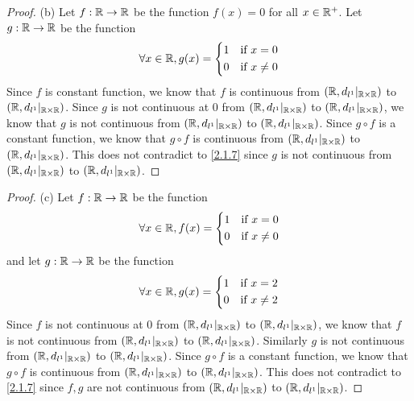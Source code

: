 \begin{proof}{(b)}
  Let \(f : \mathbb{R} \to \mathbb{R}\) be the function \(f(x) = 0\) for all \(x \in \mathbb{R}^+\).
  Let \(g : \mathbb{R} \to \mathbb{R}\) be the function
  \[
    \forall x \in \mathbb{R}, g(x) = \begin{dcases}
      1 & \text{if } x = 0    \\
      0 & \text{if } x \neq 0
    \end{dcases}
  \]
  Since \(f\) is constant function, we know that \(f\) is continuous from \((\mathbb{R}, d_{l^1}|_{\mathbb{R} \times \mathbb{R}})\) to \((\mathbb{R}, d_{l^1}|_{\mathbb{R} \times \mathbb{R}})\).
  Since \(g\) is not continuous at \(0\) from \((\mathbb{R}, d_{l^1}|_{\mathbb{R} \times \mathbb{R}})\) to \((\mathbb{R}, d_{l^1}|_{\mathbb{R} \times \mathbb{R}})\), we know that \(g\) is not continuous from \((\mathbb{R}, d_{l^1}|_{\mathbb{R} \times \mathbb{R}})\) to \((\mathbb{R}, d_{l^1}|_{\mathbb{R} \times \mathbb{R}})\).
  Since \(g \circ f\) is a constant function, we know that \(g \circ f\) is continuous from \((\mathbb{R}, d_{l^1}|_{\mathbb{R} \times \mathbb{R}})\) to \((\mathbb{R}, d_{l^1}|_{\mathbb{R} \times \mathbb{R}})\).
  This does not contradict to \cref{2.1.7} since \(g\) is not continuous from \((\mathbb{R}, d_{l^1}|_{\mathbb{R} \times \mathbb{R}})\) to \((\mathbb{R}, d_{l^1}|_{\mathbb{R} \times \mathbb{R}})\).
\end{proof}

\begin{proof}{(c)}
  Let \(f : \mathbb{R} \to \mathbb{R}\) be the function
  \[
    \forall x \in \mathbb{R}, f(x) = \begin{dcases}
      1 & \text{if } x = 0    \\
      0 & \text{if } x \neq 0
    \end{dcases}
  \]
  and let \(g : \mathbb{R} \to \mathbb{R}\) be the function
  \[
    \forall x \in \mathbb{R}, g(x) = \begin{dcases}
      1 & \text{if } x = 2    \\
      0 & \text{if } x \neq 2
    \end{dcases}
  \]
  Since \(f\) is not continuous at \(0\) from \((\mathbb{R}, d_{l^1}|_{\mathbb{R} \times \mathbb{R}})\) to \((\mathbb{R}, d_{l^1}|_{\mathbb{R} \times \mathbb{R}})\), we know that \(f\) is not continuous from \((\mathbb{R}, d_{l^1}|_{\mathbb{R} \times \mathbb{R}})\) to \((\mathbb{R}, d_{l^1}|_{\mathbb{R} \times \mathbb{R}})\).
  Similarly \(g\) is not continuous from \((\mathbb{R}, d_{l^1}|_{\mathbb{R} \times \mathbb{R}})\) to \((\mathbb{R}, d_{l^1}|_{\mathbb{R} \times \mathbb{R}})\).
  Since \(g \circ f\) is a constant function, we know that \(g \circ f\) is continuous from \((\mathbb{R}, d_{l^1}|_{\mathbb{R} \times \mathbb{R}})\) to \((\mathbb{R}, d_{l^1}|_{\mathbb{R} \times \mathbb{R}})\).
  This does not contradict to \cref{2.1.7} since \(f, g\) are not continuous from \((\mathbb{R}, d_{l^1}|_{\mathbb{R} \times \mathbb{R}})\) to \((\mathbb{R}, d_{l^1}|_{\mathbb{R} \times \mathbb{R}})\).
\end{proof}

